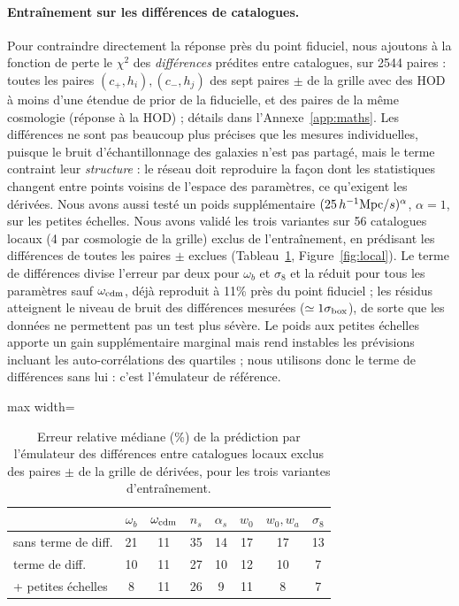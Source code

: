 \paragraph{Entraînement sur les différences de catalogues.} Pour contraindre directement la réponse près du point fiduciel, nous ajoutons à la fonction de perte le $\chi^2$ des \emph{différences} prédites entre catalogues, sur 2544 paires : toutes les paires $(c_+,h_i),(c_-,h_j)$ des sept paires $\pm$ de la grille avec des HOD à moins d'une étendue de prior de la fiducielle, et des paires de la même cosmologie (réponse à la HOD) ; détails dans l'Annexe~\ref{app:maths}. Les différences ne sont pas beaucoup plus précises que les mesures individuelles, puisque le bruit d'échantillonnage des galaxies n'est pas partagé, mais le terme contraint leur \emph{structure} : le réseau doit reproduire la façon dont les statistiques changent entre points voisins de l'espace des paramètres, ce qu'exigent les dérivées. Nous avons aussi testé un poids supplémentaire $(25\,h^{-1}\mathrm{Mpc}/s)^\alpha$, $\alpha=1$, sur les petites échelles. Nous avons validé les trois variantes sur 56 catalogues locaux (4 par cosmologie de la grille) exclus de l'entraînement, en prédisant les différences de toutes les paires $\pm$ exclues (Tableau~\ref{tab:local}, Figure~\ref{fig:local}). Le terme de différences divise l'erreur par deux pour $\omega_b$ et $\sigma_8$ et la réduit pour tous les paramètres sauf $\omega_{\rm cdm}$, déjà reproduit à 11\% près du point fiduciel ; les résidus atteignent le niveau de bruit des différences mesurées ($\simeq1\sigma_{\rm box}$), de sorte que les données ne permettent pas un test plus sévère. Le poids aux petites échelles apporte un gain supplémentaire marginal mais rend instables les prévisions incluant les auto-corrélations des quartiles ; nous utilisons donc le terme de différences sans lui : c'est l'émulateur de référence.

\begin{table}[!htbp]
\centering\small
\begin{adjustbox}{max width=\linewidth}
\begin{tabular}{lccccccc}
\toprule
 & $\omega_b$ & $\omega_{\rm cdm}$ & $n_s$ & $\alpha_s$ & $w_0$ & $w_0,w_a$ & $\sigma_8$ \\
\midrule
sans terme de diff. & 21 & 11 & 35 & 14 & 17 & 17 & 13 \\
terme de diff. & 10 & 11 & 27 & 10 & 12 & 10 & 7 \\
+ petites échelles & 8 & 11 & 26 & 9 & 11 & 8 & 7 \\
\bottomrule
\end{tabular}
\end{adjustbox}
\caption{Erreur relative médiane (\%) de la prédiction par l'émulateur des différences entre catalogues locaux exclus des paires $\pm$ de la grille de dérivées, pour les trois variantes d'entraînement.}
\label{tab:local}
\end{table}

